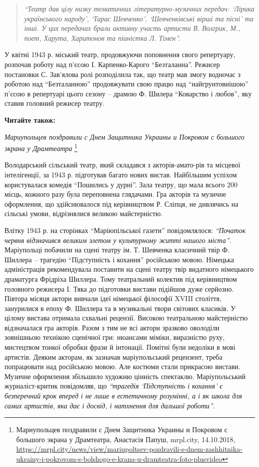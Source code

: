 \begin{quote}
\em\enquote{Театр дав
цілу низку тематичних літературно-музичних передач: \enquote{Лірика українського
народу}, \enquote{Тарас Шевченко}, \enquote{Шевченківські вірші та пісні} та інші. У цих
передачах брали активну участь артисти В. Волгрик, М., поет, Харута, Харитонов
та піаністка Л. Тімен}. 
\end{quote}

У квітні 1943 р. міський театр, продовжуючи поповнення свого репертуару,
розпочав роботу над п'єсою І. Карпенко-Карого \enquote{Безталанна}. Режисер постановки
С. Зав'ялова ролі розподілила так, що театр мав змогу водночас з роботою над
\enquote{Безталанною} продовжувати свою працю над \enquote{найгрунтовнішою} п'єсою в репертуарі
цього сезону – драмою Ф. Шилера \enquote{Коварство і любов}, яку ставив головний
режисер театру.

\textbf{Читайте також:} 

\emph{Мариупольцев поздравили с Днем Защитника Украины и Покровом с большого экрана у Драмтеатра}%
\footnote{Мариупольцев поздравили с Днем Защитника Украины и Покровом с большого экрана у Драмтеатра, Анастасія Папуш, mrpl.city, %
14.10.2018, \url{https://mrpl.city/news/view/mariupoltsev-pozdravili-s-dnem-zashhitnika-ukrainy-i-pokrovom-s-bolshogo-e-krana-u-dramteatra-foto-plusvideo}}

Володарський сільський театр, який складався з акторів-амато\hyp{}рів та місцевої
інтелігенції, за 1943 р. підготував багато нових вистав. Найбільшим успіхом
користувалася комедія \enquote{Пошились у дурні}. Зала театру, що мала всього 200
місць, кожного разу була переповнена глядачами. Гра акторів та музичне
оформлення, що здійснювалося під керівництвом Р. Сліпця, не дивлячись на
сільські умови, відрізнялися великою майстерністю.

Влітку 1943 р. на сторінках \enquote{Маріюпільської газети} повідомлялося: \emph{\enquote{Початок
червня відзначився великим злетом у культурному житті нашого міста}}.
Маріупольці побачили на сцені театру ім. Т. Шевченка класичний твір Ф. Шиллера
– трагедію \enquote{Підступність і кохання} російською мовою. Німецька адміністрація
рекомендувала поставити на сцені театру твір видатного німецького драматурга
Фрідріха Шиллера. Тому театральний колектив під керівництвом головного режисера
І. Тяка до підготовки вистави підійшов дуже серйозно. Півтора місяця актори
вивчали ідеї німецької філософії XVIII століття, занурилися в епоху Ф. Шиллера
та в музикальні твори світових класиків. У цілому вистава отримала схвальні
рецензії. Високою театральною майстерністю відзначалася гра акторів. Разом з
тим не всі актори зразково оволоділи зовнішньою технікою сценічної гри:
нюансами міміки, виразністю руху, мистецтвом тонкої обробки фрази й інтонації.
Помітні були недоліки в мові артистів. Деяким акторам, як зазначав
маріупольський рецензент, треба попрацювати над російською мовою. Але костюми
стали прикрасою вистави. Музичне оформлення збільшило художню цінність
спектаклю. Маріупольський журналіст-критик повідомляв, що \emph{\enquote{трагедія
\enquote{Підступність і кохання} є безперечний крок вперед і не лише в естетичному
розумінні, а і як школа для самих артистів, яка дає і досвід, і натхнення для
дальшої роботи}}.

